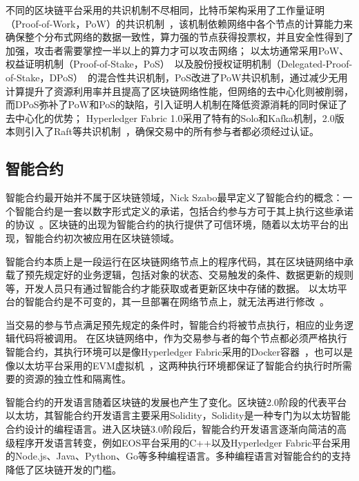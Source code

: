 不同的区块链平台采用的共识机制不尽相同，比特币架构采用了工作量证明（Proof-of-Work，PoW）的共识机制~\cite{XuanHan}，该机制依赖网络中各个节点的计算能力来确保整个分布式网络的数据一致性，算力强的节点获得投票权，并且安全性得到了加强，攻击者需要掌控一半以上的算力才可以攻击网络；
以太坊通常采用PoW、权益证明机制（Proof-of-Stake，PoS）~\cite{DBLP:conf/iceccs/ThinDBD18}以及股份授权证明机制（Delegated-Proof-of-Stake，DPoS）~\cite{YongZhang}的混合性共识机制，PoS改进了PoW共识机制，通过减少无用计算提升了资源利用率并且提高了区块链网络性能，但网络的去中心化则被削弱，而DPoS弥补了PoW和PoS的缺陷，引入证明人机制在降低资源消耗的同时保证了去中心化的优势；
Hyperledger Fabric 1.0采用了特有的Solo和Kafka机制，2.0版本则引入了Raft等共识机制~\cite{ShaoqiWang, ZhikeWang}，确保交易中的所有参与者都必须经过认证。

\subsection{智能合约}

智能合约最开始并不属于区块链领域，Nick Szabo最早定义了智能合约的概念：一个智能合约是一套以数字形式定义的承诺，包括合约参与方可于其上执行这些承诺的协议~\cite{DBLP:journals/fgcs/ZhengXDCCWI20}。区块链的出现为智能合约的执行提供了可信环境，随着以太坊平台的出现，智能合约初次被应用在区块链领域。

智能合约本质上是一段运行在区块链网络节点上的程序代码，其在区块链网络中承载了预先规定好的业务逻辑，包括对象的状态、交易触发的条件、数据更新的规则等，开发人员只有通过智能合约才能获取或者更新区块中存储的数据。
以太坊平台的智能合约是不可变的，其一旦部署在网络节点上，就无法再进行修改~\cite{DBLP:journals/corr/abs-1807-01868}。

当交易的参与节点满足预先规定的条件时，智能合约将被节点执行，相应的业务逻辑代码将被调用。
在区块链网络中，作为交易参与者的每个节点都必须严格执行智能合约，其执行环境可以是像Hyperledger Fabric采用的Docker容器~\cite{DBLP:journals/sigops/Boettiger15}，也可以是像以太坊平台采用的EVM虚拟机~\cite{DBLP:journals/corr/abs-1710-06372}，这两种执行环境都保证了智能合约执行时所需要的资源的独立性和隔离性。

智能合约的开发语言随着区块链的发展也产生了变化。区块链2.0阶段的代表平台以太坊，其智能合约开发语言主要采用Solidity，Solidity是一种专门为以太坊智能合约设计的编程语言。进入区块链3.0阶段后，智能合约开发语言逐渐向简洁的高级程序开发语言转变，例如EOS平台采用的C++以及Hyperledger Fabric平台采用的Node.js、Java、Python、Go等多种编程语言。多种编程语言对智能合约的支持降低了区块链开发的门槛。

